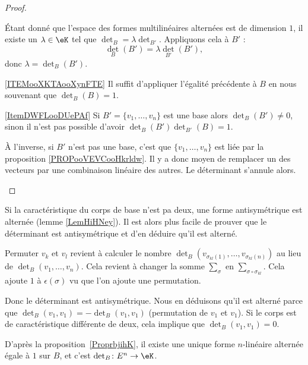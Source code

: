 \begin{proof}
\begin{subproof}
            Étant donné que l'espace des formes multilinéaires alternées est de dimension \( 1\), il existe un \( \lambda\in \eK\) tel que \( \det_B=\lambda\det_{B'}\). Appliquons cela à \( B'\) :
            \begin{equation}
                \det_B(B')=\lambda\det_{B'}(B'),
            \end{equation}
            donc \( \lambda=\det_B(B')\).
        \item[\ref{ITEMooXKTAooXynFTE}]
            Il suffit d'appliquer l'égalité précédente à \( B\) en nous souvenant que \( \det_B(B)=1\).
        \item[\ref{ItemDWFLooDUePAf}]
            Si \( B'=\{ v_1,\ldots, v_n \}\) est une base alors \( \det_B(B')\neq 0\), sinon il n'est pas possible d'avoir \( \det_B(B')\det_{B'}(B)=1\).

            À l'inverse, si \( B'\) n'est pas une base, c'est que \( \{ v_1,\ldots, v_n \}\) est liée par la proposition \ref{PROPooVEVCooHkrldw}. Il y a donc moyen de remplacer un des vecteurs par une combinaison linéaire des autres. Le déterminant s'annule alors.
    \end{subproof}
\end{proof}

\begin{normaltext}      \label{NORMooAEJLooSnDBhy}
    Si la caractéristique du corps de base n'est pa deux, une forme antisymétrique est alternée (lemme \ref{LemHiHNey}). Il est alors plus facile de prouver que le déterminant est antisymétrique et d'en déduire qu'il est alterné.

    Permuter \( v_k\) et \( v_l\) revient à calculer le nombre \( \det_B( v_{\sigma_{kl}(1)},\ldots, v_{\sigma_{kl}(n)} )\) au lieu de \( \det_B(v_1,\ldots, v_n)\). Cela revient à changer la somme \( \sum_{\sigma}\) en \( \sum_{\sigma\circ\sigma_{kl}}\). Cela ajoute \( 1\) à \( \epsilon(\sigma)\) vu que l'on ajoute une permutation.

    Donc le déterminant est antisymétrique. Nous en déduisons qu'il est alterné parce que \( \det_B(v_1,v_1)=-\det_B(v_1,v_1)\) (permutation de \( v_1\) et \( v_1\)). Si le corps est de caractéristique différente de deux, cela implique que \( \det_B(v_1,v_1)=0\).
\end{normaltext}

D'après la proposition~\ref{ProprbjihK}, il existe une unique forme \( n\)-linéaire alternée égale à \( 1\) sur \( B\), et c'est \( \det_B\colon E^n\to \eK\).

